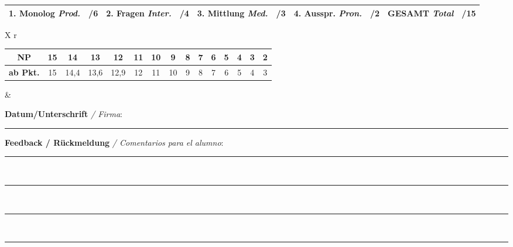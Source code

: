 \documentclass[10pt, a4paper]{article}
\newcommand{\pbox}{\fbox{\rule{0pt}{1em}\hspace{0.8cm}}}
\newcommand{\es}[1]{{\scriptsize\color{es}\textit{#1}}}  %
\begin{document}
\vspace{3pt}


\begin{tabularx}{\textwidth}{|l|c|l|c|l|c|l|c||X|c|}
\hline
\rowcolor{hellgrau}
\textbf{1. Monolog} \es{Prod.} & \pbox/6 &
\textbf{2. Fragen} \es{Inter.} & \pbox/4 &
\textbf{3. Mittlung} \es{Med.} & \pbox/3 &
\textbf{4. Ausspr.} \es{Pron.} & \pbox/2 &
\cellcolor{rot!20}\textbf{GESAMT} \es{Total} & \cellcolor{rot!20}\pbox\textbf{/15} \\
\hline
\end{tabularx}

\vspace{2pt}

\begin{tabularx}{\textwidth}{X r}
{\tiny
\begin{tabular}{|c|c|c|c|c|c|c|c|c|c|c|c|c|c|c|}
\hline
\rowcolor{grau}
\textbf{NP} & 15 & 14 & 13 & 12 & 11 & 10 & 9 & 8 & 7 & 6 & 5 & 4 & 3 & 2 \\
\hline
\textbf{ab Pkt.} & 15 & 14,4 & 13,6 & 12,9 & 12 & 11 & 10 & 9 & 8 & 7 & 6 & 5 & 4 & 3 \\
\hline
\end{tabular}}
&
{\footnotesize\textbf{Datum/Unterschrift} \es{/ Firma}: \rule{4cm}{0.4pt}}
\end{tabularx}

\vspace{4pt}

{\small\textbf{Feedback / Rückmeldung} \es{/ Comentarios para el alumno}:}\\[-2pt]
\rule{\textwidth}{0.4pt}\\[-1pt]
\rule{\textwidth}{0.4pt}\\[-1pt]
\rule{\textwidth}{0.4pt}\\[-1pt]
\rule{\textwidth}{0.4pt}
\end{document}
